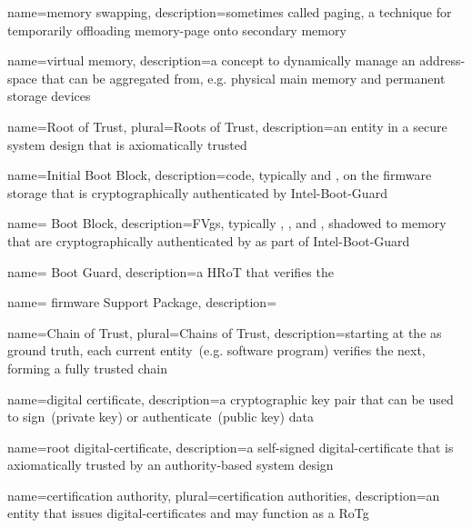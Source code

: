 {
  name={memory swapping},
  description={sometimes called paging, a technique for temporarily offloading \gls{memory-page} onto secondary memory}
}

{
  name={virtual memory},
  description={a concept to dynamically manage an \gls{address-space} that can be aggregated from, e.g. physical main memory and permanent storage devices}
}

{
  name={Root of Trust},
  plural={Roots of Trust},
  description={an entity in a secure system design that is axiomatically trusted}
}

{
  name={Initial Boot Block},
  description={code, typically  and , on the \gls{firmware} storage that is cryptographically authenticated by \gls{Intel-Boot-Guard}}
}

{
  name={ Boot Block},
  description={\glspl{FVg}, typically , , and , shadowed to memory that are cryptographically authenticated by  as part of \gls{Intel-Boot-Guard}}
}

{
  name={ Boot Guard},
  description={a \gls{HRoT} that verifies the }
}

{
  name={ \Gls{firmware} Support Package},
  description={}
}

{
  name={Chain of Trust},
  plural={Chains of Trust},
  description={starting at the  as ground truth, each current entity~(e.g. software program) verifies the next, forming a fully trusted chain}
}

{
  name={digital certificate},
  description={a cryptographic key pair that can be used to sign~(private key) or authenticate~(public key) data}
}

{
  name={root \gls{digital-certificate}},
  description={a self-signed \gls{digital-certificate} that is axiomatically trusted by an authority-based system design}
}

{
  name={certification authority},
  plural={certification authorities},
  description={an entity that issues \glspl{digital-certificate} and may function as a \gls{RoTg}}
}

